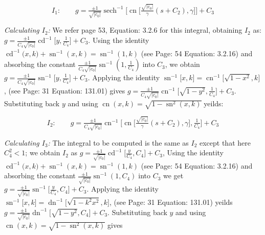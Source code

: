 \documentclass[12pt]{article}
\theoremstyle{plain}
\theoremstyle{definition}
\theoremstyle{remark}
\begin{document}
 \begin{equation}\label{eqn: soln k<0, c_0 neq 0, g: case 3.1}
 	\boxed{I_1:\qquad g=\tfrac{\pm 1}{\sqrt{|c_0|}}\operatorname{sech}^{-1}\Big[\operatorname{cn}\big[\tfrac{\sqrt{|c_0|}}{\gamma}(s+C_2),\gamma\big]\Big]+C_3}
 \end{equation}
 
 \textit{Calculating \(I_2\): } We refer \cite{La} page 53, Equation: 3.2.6 for this integral, obtaining \(I_2\) as: \footnotesize\(g=\tfrac{\pm 1}{C_4\sqrt{|c_0|}} \operatorname{cd}^{-1}\big[y,\tfrac{1}{C_4}\big] + C_3\)\normalsize. Using the identity \(\operatorname{cd}^{-1}\!\big(x,k\big)+\operatorname{sn}^{-1}(x,k)=\operatorname{sn}^{-1}(1,k)\) (see \cite{La} Page: 54 Equation: 3.2.16) and absorbing the constant \footnotesize\(\tfrac{\pm 1}{C_4\sqrt{|c_0|}}\operatorname{sn}^{-1}(1,\tfrac{1}{C_4})\;\)\normalsize into \(C_3\), we obtain \footnotesize\(g=\tfrac{\pm 1}{C_4\sqrt{|c_0|}} \operatorname{sn}^{-1}\big[y,\tfrac{1}{C_4}\big] + C_3\)\normalsize. Applying the identity \footnotesize\(\operatorname{sn}^{-1}\big[x,k\big]=\operatorname{cn}^{-1}\big[\sqrt{1-x^2},k\big]\)\normalsize, (see \cite{BF} Page: 31 Equation: 131.01) gives \footnotesize\(g=\tfrac{\pm 1}{ C_4\sqrt{|c_0|}} \operatorname{cn}^{-1}\big[\sqrt{1-y^2},\tfrac{1}{C_4}\big] + C_3\)\normalsize. Substituting back \(y\) and using \footnotesize\(\operatorname{cn}(x,k)=\sqrt{1-\operatorname{sn}^2(x,k)}\;\)\normalsize yeilds: 
 
 \begin{equation}\label{eqn: soln k<0, c_0 neq 0, g: case 3.2}
 	\boxed{I_2:\qquad g=\tfrac{\pm 1}{C_4\sqrt{|c_0|}} \operatorname{cn}^{-1}\big[\operatorname{cn}\big[\tfrac{\sqrt{|c_0|}}{\gamma}(s+C_2),\gamma\big],\tfrac{1}{C_4}\big] + C_3}
 \end{equation}
 
 \textit{Calculating \(I_3\): } The integral to be computed is the same as \(I_2\) except that here \(C_4^2<1\); we obtain \(I_2\) as \footnotesize\(g=\tfrac{\pm 1}{\sqrt{|c_0|}} \operatorname{cd}^{-1}\big[\tfrac{y}{C_4},C_4\big] + C_3\)\normalsize, Using the identity \(\operatorname{cd}^{-1}\!\big(x,k\big)+\operatorname{sn}^{-1}(x,k)=\operatorname{sn}^{-1}(1,k)\) (see \cite{La} Page: 54 Equation: 3.2.16) and absorbing the constant  \footnotesize\(\tfrac{\pm 1}{\sqrt{|c_0|}}\operatorname{sn}^{-1}(1,C_4)\;\)\normalsize into \(C_3\) we get \footnotesize\(g=\tfrac{\pm 1}{\sqrt{|c_0|}} \operatorname{sn}^{-1}\big[\tfrac{y}{C_4},C_4\big] + C_3\)\normalsize. Applying the identity \footnotesize\(\operatorname{sn}^{-1}\big[x,k\big]=\operatorname{dn}^{-1}\big[\sqrt{1-k^2x^2},k\big]\)\normalsize, (see \cite{BF} Page: 31 Equation: 131.01) yeilds \footnotesize\(g=\tfrac{\pm 1}{\sqrt{|c_0|}} \operatorname{dn}^{-1}\big[\sqrt{1-y^2},C_4\big] + C_3\)\normalsize. Substituting back \(y\) and using \footnotesize\(\operatorname{cn}(x,k)=\sqrt{1-\operatorname{sn}^2(x,k)}\;\)\normalsize gives
 
\end{document}
